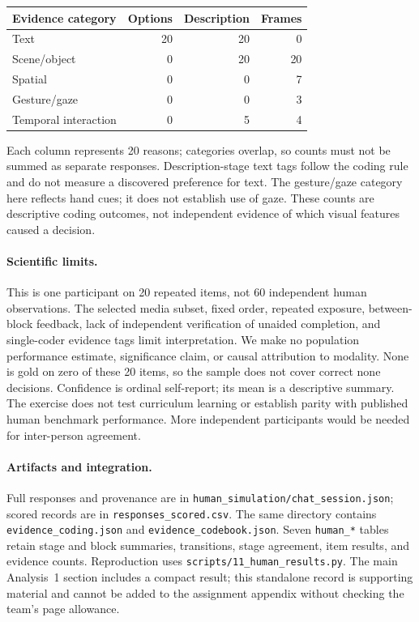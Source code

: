 \begin{center}
\begin{tabular}{lrrr}\toprule
Evidence category & Options & Description & Frames\\\midrule
Text & 20 & 20 & 0\\
Scene/object & 0 & 20 & 20\\
Spatial & 0 & 0 & 7\\
Gesture/gaze & 0 & 0 & 3\\
Temporal interaction & 0 & 5 & 4\\\bottomrule
\end{tabular}
\end{center}
Each column represents 20 reasons; categories overlap, so counts must not be summed as separate responses. Description-stage text tags follow the coding rule and do not measure a discovered preference for text. The gesture/gaze category here reflects hand cues; it does not establish use of gaze. These counts are descriptive coding outcomes, not independent evidence of which visual features caused a decision.

\paragraph{Scientific limits.} This is one participant on 20 repeated items, not 60 independent human observations. The selected media subset, fixed order, repeated exposure, between-block feedback, lack of independent verification of unaided completion, and single-coder evidence tags limit interpretation. We make no population performance estimate, significance claim, or causal attribution to modality. None is gold on zero of these 20 items, so the sample does not cover correct none decisions. Confidence is ordinal self-report; its mean is a descriptive summary. The exercise does not test curriculum learning or establish parity with published human benchmark performance. More independent participants would be needed for inter-person agreement.

\begingroup\raggedright
\paragraph{Artifacts and integration.} Full responses and provenance are in \texttt{human\_simulation/chat\_session.json}; scored records are in \texttt{responses\_scored.csv}. The same directory contains \texttt{evidence\_coding.json} and \texttt{evidence\_codebook.json}. Seven \texttt{human\_*} tables retain stage and block summaries, transitions, stage agreement, item results, and evidence counts. Reproduction uses \texttt{scripts/11\_human\_results.py}. The main Analysis~1 section includes a compact result; this standalone record is supporting material and cannot be added to the assignment appendix without checking the team's page allowance.
\par\endgroup
